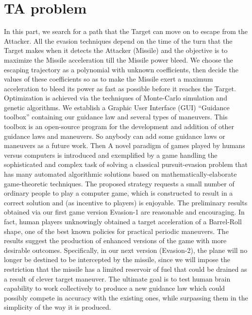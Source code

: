 \label{conclusions}

\section{TA problem}

In this part, we search for a path that the Target can move on to escape from the Attacker. All the evasion techniques depend on the time of the turn that the Target makes when it detects the Attacker (Missile) and the objective is to maximize the Missile acceleration till the Missile power bleed. We choose the escaping trajectory as a polynomial with unknown coefficients, then decide the values of these coefficients so as to make the Missile exert a maximum acceleration to bleed its power as fast as possible before it reaches the Target. Optimization is achieved via the techniques of Monte-Carlo simulation and genetic algorithms. We establish a Graphic User Interface (GUI) “Guidance toolbox” containing our guidance law and several types of maneuvers. This toolbox is an open-source program for the development and addition of other guidance laws and maneuvers. So anybody can add some guidance laws or maneuvers as a future work.
Then A novel paradigm of games played by humans versus computers is introduced and exemplified by a game handling the sophisticated and complex task of solving a classical pursuit-evasion problem that has many automated algorithmic solutions based on mathematically-elaborate game-theoretic techniques. The proposed strategy requests a small number of ordinary people to play a computer game, which is constructed to result in a correct solution and (as incentive to players) is enjoyable. The preliminary results obtained via our first game version Evasion-1 are reasonable and encouraging. In fact, human players unknowingly obtained a target acceleration of a Barrel-Roll shape, one of the best known policies for practical periodic maneuvers. The results suggest the production of enhanced versions of the game with more desirable outcomes. Specifically, in our next version (Evasion-2), the plane will no longer be destined to be intercepted by the missile, since we will impose the restriction that the missile has a limited reservoir of fuel that could be drained as a result of clever target maneuver. The ultimate goal is to test human brain capability to work collectively to produce a new guidance law which could possibly compete in accuracy with the existing ones, while surpassing them in the simplicity of the way it is produced. 

